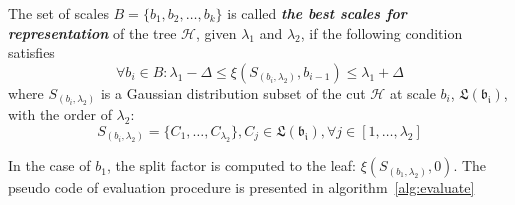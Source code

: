 \begin{definition}
\label{def:best_scales} The set of scales $\mathsf{\textit{B}} = \{b_1, b_2, \ldots, b_k\}$ is called \textbf{\textit{the best scales for representation}} of the tree $\mathcal{H}$, given $\lambda_1$ and $\lambda_2$, if the following condition satisfies
\begin{equation}
\label{equ:best_scale}
\forall b_i \in \mathsf{\textit{B}}: \lambda_1 - \Delta \leq \xi(S_{(b_i,\lambda_2)},b_{i-1}) \leq \lambda_1 + \Delta 
\end{equation}
where $S_{(b_i,\lambda_2)}$ is a Gaussian distribution subset of the cut $\mathcal{H}$ at scale $b_i$, $\mathfrak{L(b_i)}$, with the order of $\lambda_2$:
\begin{equation}
S_{(b_i,\lambda_2)} = \{C_1, \ldots, C_{\lambda_2}\}, C_j \in \mathfrak{L(b_i)}, \forall j \in [1, \ldots, \lambda_2] 
\end{equation}
\end{definition}
In the case of $b_1$, the split factor is computed to the leaf: $\xi(S_{(b_1,\lambda_2)},0)$. The pseudo code of evaluation procedure is presented in algorithm~\ref{alg:evaluate}
%
%
%
%
%
%
